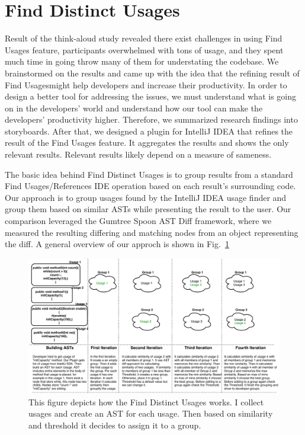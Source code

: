 \documentclass[conference]{IEEEtran}
\begin{document}
\section{Find Distinct Usages}
Result of the think-aloud study revealed there exist challenges in using Find Usages feature, participants overwhelmed with tons of usage, and they spent much time in going throw many of them for understating the codebase. We brainstormed on the results and came up with the idea that the refining result of Find Usagesmight help developers and increase their productivity. In order to design a better tool for addressing the issues, we must understand what is going on in the developers' world and understand how our tool can make the developers' productivity higher. Therefore, we summarized research findings into storyboards. After that, we designed a plugin for IntelliJ IDEA that refines the result of the Find Usages feature. It aggregates the results and shows the only relevant results. Relevant results likely depend on a measure of sameness.\par
The basic idea behind Find Distinct Usages is to group results from a standard Find Usages/References IDE operation based on each result's surrounding code. Our approach is to group usages found by the IntelliJ IDEA usage finder and group them based on similar ASTs while presenting the result to the user. Our comparison leveraged the Gumtree Spoon AST Diff framework, where we measured the resulting differing and matching nodes from an object representing the diff. A general overview of our approch is shown in Fig.~\ref{fig:general} 

\begin{figure}
    \centering
    \includegraphics [width=\textwidth,keepaspectratio,clip]{figures/generlView.pdf}
    \caption{This figure depicts how the Find Distinct Usages works. I collect usages and create an AST for each usage. Then based on similarity and threshold it decides to assign it to a group. }
\label{fig:general}
\end{figure}
\end{document}
